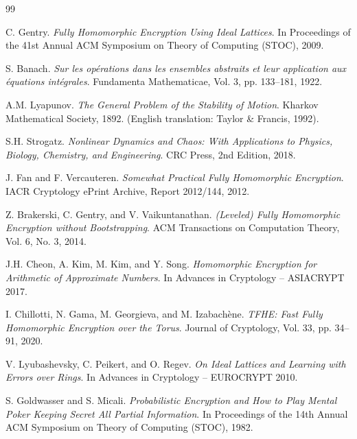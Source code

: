 \documentclass{article}
\begin{document}
\begin{thebibliography}{99}

 C. Gentry.
\textit{Fully Homomorphic Encryption Using Ideal Lattices}.
In Proceedings of the 41st Annual ACM Symposium on Theory of Computing (STOC), 2009.

 S. Banach.
\textit{Sur les op\'erations dans les ensembles abstraits et leur application aux \'equations int\'egrales}.
Fundamenta Mathematicae, Vol. 3, pp. 133--181, 1922.

 A.M. Lyapunov.
\textit{The General Problem of the Stability of Motion}.
Kharkov Mathematical Society, 1892. (English translation: Taylor \& Francis, 1992).

 S.H. Strogatz.
\textit{Nonlinear Dynamics and Chaos: With Applications to Physics, Biology, Chemistry, and Engineering}.
CRC Press, 2nd Edition, 2018.

 J. Fan and F. Vercauteren.
\textit{Somewhat Practical Fully Homomorphic Encryption}.
IACR Cryptology ePrint Archive, Report 2012/144, 2012.

 Z. Brakerski, C. Gentry, and V. Vaikuntanathan.
\textit{(Leveled) Fully Homomorphic Encryption without Bootstrapping}.
ACM Transactions on Computation Theory, Vol. 6, No. 3, 2014.

 J.H. Cheon, A. Kim, M. Kim, and Y. Song.
\textit{Homomorphic Encryption for Arithmetic of Approximate Numbers}.
In Advances in Cryptology -- ASIACRYPT 2017.

 I. Chillotti, N. Gama, M. Georgieva, and M. Izabach\`ene.
\textit{TFHE: Fast Fully Homomorphic Encryption over the Torus}.
Journal of Cryptology, Vol. 33, pp. 34--91, 2020.

 V. Lyubashevsky, C. Peikert, and O. Regev.
\textit{On Ideal Lattices and Learning with Errors over Rings}.
In Advances in Cryptology -- EUROCRYPT 2010.

 S. Goldwasser and S. Micali.
\textit{Probabilistic Encryption and How to Play Mental Poker Keeping Secret All Partial Information}.
In Proceedings of the 14th Annual ACM Symposium on Theory of Computing (STOC), 1982.

\end{thebibliography}
\end{document}
